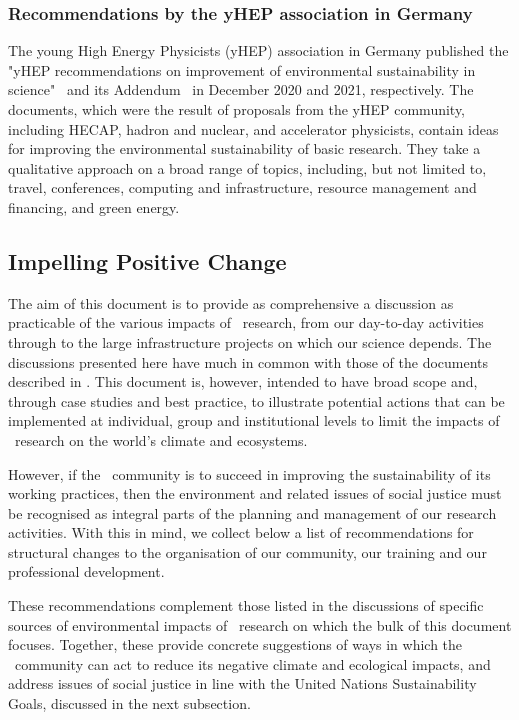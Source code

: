 \documentclass[../SustainableHEP.tex]{subfiles}
\begin{document}
\subsubsection{Recommendations by the yHEP association in Germany}

The young High Energy Physicists (yHEP) association in Germany published the "yHEP recommendations on improvement of environmental sustainability in science"~\cite{yHEP1} and its Addendum~\cite{yHEP2} in December 2020 and 2021, respectively. The documents, which were the result of proposals from the yHEP community, including HECAP, hadron and nuclear, and accelerator physicists, contain ideas for improving the environmental sustainability of basic research. They take a qualitative approach on a broad range of topics, including, but not limited to, travel, conferences, computing and infrastructure, resource management and financing, and green energy. 


\subsection{Impelling Positive Change}

The aim of this document is to provide as comprehensive a discussion as practicable of the various impacts of \ACR\ research, from our day-to-day activities through to the large infrastructure projects on which our science depends. The discussions presented here have much in common with those of the documents described in . This document is, however, intended to have broad scope and, through case studies and best practice, to illustrate potential actions that can be implemented at individual, group and institutional levels to limit the impacts of \ACR\ research on the world's climate and ecosystems.

However, if the \ACR\ community is to succeed in improving the sustainability of its working practices, then the environment and related issues of social justice must be recognised as integral parts of the planning and management of our research activities. With this in mind, we collect below a list of recommendations for structural changes to the organisation of our community, our training and our professional development.

These recommendations complement those listed in the discussions of specific sources of environmental impacts of \ACR\ research on which the bulk of this document focuses. Together, these provide concrete suggestions of ways in which the \ACR\ community can act to reduce its negative climate and ecological impacts, and address issues of social justice in line with the United Nations Sustainability Goals, discussed in the next subsection.
\end{document}
